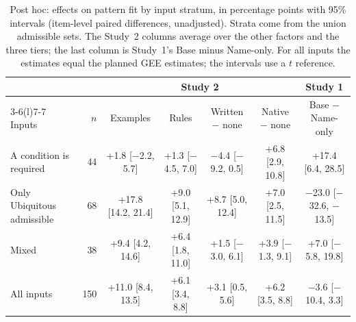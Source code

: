 \begin{table}
  \caption{Post hoc: effects on pattern fit by input stratum, in percentage points with 95\% intervals (item-level paired differences, unadjusted). Strata come from the union admissible sets. The Study~2 columns average over the other factors and the three tiers; the last column is Study~1's Base minus Name-only. For all inputs the estimates equal the planned GEE estimates; the intervals use a $t$ reference.}
  \label{tab:strata}
  \footnotesize
  \setlength{\tabcolsep}{2.5pt}
  \begin{tabular}{@{}lrccccc@{}}
    \toprule
    & & \multicolumn{4}{c}{Study 2} & Study 1 \\
    \cmidrule(lr){3-6}\cmidrule(l){7-7}
    Inputs & $n$ & Examples & Rules & Written $-$ none & Native $-$ none & Base $-$ Name-only \\
    \midrule
    A condition is required & 44 & +1.8 [$-$2.2, 5.7] & +1.3 [$-$4.5, 7.0] & $-$4.4 [$-$9.2, 0.5] & +6.8 [2.9, 10.8] & +17.4 [6.4, 28.5] \\
    Only Ubiquitous admissible & 68 & +17.8 [14.2, 21.4] & +9.0 [5.1, 12.9] & +8.7 [5.0, 12.4] & +7.0 [2.5, 11.5] & $-$23.0 [$-$32.6, $-$13.5] \\
    Mixed & 38 & +9.4 [4.2, 14.6] & +6.4 [1.8, 11.0] & +1.5 [$-$3.0, 6.1] & +3.9 [$-$1.3, 9.1] & +7.0 [$-$5.8, 19.8] \\
    \midrule
    All inputs & 150 & +11.0 [8.4, 13.5] & +6.1 [3.4, 8.8] & +3.1 [0.5, 5.6] & +6.2 [3.5, 8.8] & $-$3.6 [$-$10.4, 3.3] \\
    \bottomrule
  \end{tabular}
\end{table}
